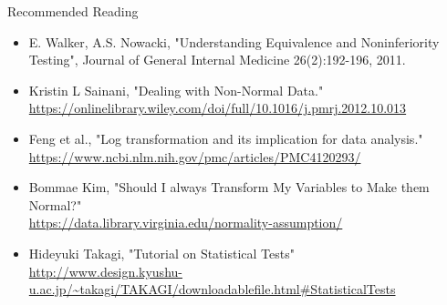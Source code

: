 \begin{frame}{Recommended Reading}{}

  {\smaller
  \begin{itemize}
    \item E. Walker, A.S. Nowacki, "Understanding Equivalence and Noninferiority Testing", Journal of General Internal Medicine 26(2):192-196, 2011.
    \item Kristin L Sainani, "Dealing with Non-Normal Data."\\ \url{https://onlinelibrary.wiley.com/doi/full/10.1016/j.pmrj.2012.10.013}
    \item Feng et al., "Log transformation and its implication for data analysis."\\ \url{https://www.ncbi.nlm.nih.gov/pmc/articles/PMC4120293/}
    \item Bommae Kim, "Should I always Transform My Variables to Make them Normal?"\\ \url{https://data.library.virginia.edu/normality-assumption/}
    \item Hideyuki Takagi, "Tutorial on Statistical Tests"\\ \url{http://www.design.kyushu-u.ac.jp/~takagi/TAKAGI/downloadablefile.html\#StatisticalTests}
  \end{itemize}}

\end{frame}
